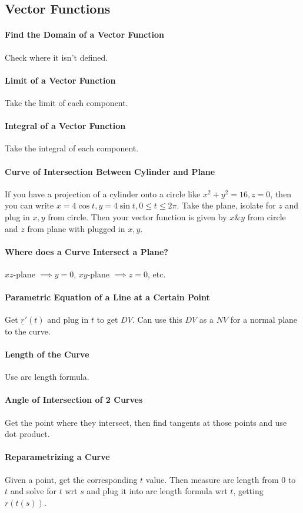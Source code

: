 \documentclass[12 pt]{article}
\theoremstyle{definition}
\begin{document}
\subsection{Vector Functions}
\paragraph{Find the Domain of a Vector Function} Check where it isn't defined.
\paragraph{Limit of a Vector Function} Take the limit of each component.
\paragraph{Integral of a Vector Function} Take the integral of each component.
\paragraph{Curve of Intersection Between Cylinder and Plane} If you have a projection of a cylinder onto a circle like $x^2+y^2=16,z=0$, then you can write $x=4\cos t,y=4 \sin t, 0\leq t \leq 2\pi$. Take the plane, isolate for $z$ and plug in $x,y$ from circle. Then your vector function is given by $x \& y$ from circle and $z$ from plane with plugged in $x,y$.
\paragraph{Where does a Curve Intersect a Plane?}$xz$-plane $\implies y=0$, $xy$-plane $\implies z=0$, etc.
\paragraph{Parametric Equation of a Line at a Certain Point} Get $\underline{r}'(t)$ and plug in $t$ to get $DV$. Can use this $DV$ as a $NV$ for a normal plane to the curve.
\paragraph{Length of the Curve} Use arc length formula. 
\paragraph{Angle of Intersection of 2 Curves} Get the point where they intersect, then find tangents at those points and use dot product.
\paragraph{Reparametrizing a Curve} Given a point, get the corresponding $t$ value. Then measure arc length from $0$ to $t$ and solve for $t$ wrt $s$ and plug it into arc length formula wrt $t$, getting $r(t(s))$.
\end{document}
